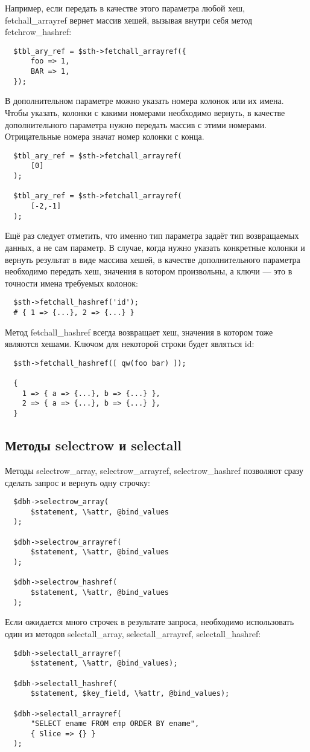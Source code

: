 Например, если передать в качестве этого параметра любой хеш, fetchall\_arrayref вернет массив хешей, вызывая внутри себя метод fetchrow\_hashref:
\begin{verbatim}
  $tbl_ary_ref = $sth->fetchall_arrayref({
      foo => 1,
      BAR => 1,
  });
\end{verbatim}
В дополнительном параметре можно указать номера колонок или их имена. Чтобы указать, колонки с какими номерами необходимо вернуть, в качестве дополнительного параметра нужно передать массив с этими номерами. Отрицательные номера значат номер колонки с конца.
\begin{verbatim}
  $tbl_ary_ref = $sth->fetchall_arrayref(
      [0]
  );

  $tbl_ary_ref = $sth->fetchall_arrayref(
      [-2,-1]
  );
\end{verbatim}
Ещё раз следует отметить, что именно тип параметра задаёт тип возвращаемых данных, а не сам параметр. В случае, когда нужно указать конкретные колонки и вернуть результат в виде массива хешей, в качестве дополнительного параметра необходимо передать хеш, значения в котором произвольны, а ключи --- это в точности имена требуемых колонок:
\begin{verbatim}
  $sth->fetchall_hashref('id');
  # { 1 => {...}, 2 => {...} }
\end{verbatim}
Метод fetchall\_hashref всегда возвращает хеш, значения в котором тоже являются хешами. Ключом для некоторой строки будет являться id:
\begin{verbatim}
  $sth->fetchall_hashref([ qw(foo bar) ]);

  {
    1 => { a => {...}, b => {...} },
    2 => { a => {...}, b => {...} },
  }
\end{verbatim}

\subsection{Методы selectrow и selectall}
Методы selectrow\_array, selectrow\_arrayref,  selectrow\_hashref позволяют сразу сделать запрос и вернуть одну строчку:
\begin{verbatim}
  $dbh->selectrow_array(
      $statement, \%attr, @bind_values
  );

  $dbh->selectrow_arrayref(
      $statement, \%attr, @bind_values
  );

  $dbh->selectrow_hashref(
      $statement, \%attr, @bind_values
  );
\end{verbatim}
Если ожидается много строчек в результате запроса, необходимо использовать один из методов selectall\_array, selectall\_arrayref, selectall\_hashref:
\begin{verbatim}
  $dbh->selectall_arrayref(
      $statement, \%attr, @bind_values);

  $dbh->selectall_hashref(
      $statement, $key_field, \%attr, @bind_values);

  $dbh->selectall_arrayref(
      "SELECT ename FROM emp ORDER BY ename",
      { Slice => {} }
  );
\end{verbatim}


